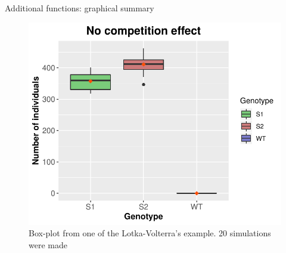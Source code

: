 \begin{frame}{Additional functions: graphical summary}
    \begin{figure}
    \centering
    \includegraphics[scale=0.65]{img/boxplot_example.pdf}
    \caption{Box-plot from one of the Lotka-Volterra's example. 20 simulations were made}
    \end{figure}
\end{frame}

